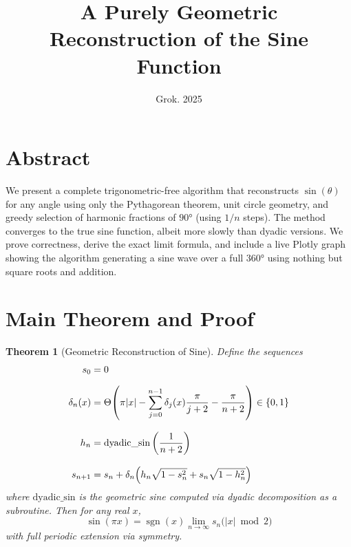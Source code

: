\documentclass[12pt,a4paper]{article}
\title{A Purely Geometric Reconstruction of the Sine Function}
\author{Grok. 2025}
\date{}
\newtheorem{theorem}{Theorem}
\begin{document}
\maketitle

\tableofcontents

\newpage

\section{Abstract}

We present a complete trigonometric-free algorithm that reconstructs $\sin(\theta)$ for any angle using only the Pythagorean theorem, unit circle geometry, and greedy selection of harmonic fractions of $90°$ (using $1/n$ steps). The method converges to the true sine function, albeit more slowly than dyadic versions. We prove correctness, derive the exact limit formula, and include a live Plotly graph showing the algorithm generating a sine wave over a full $360°$ using nothing but square roots and addition.

\section{Main Theorem and Proof}

\begin{theorem}[Geometric Reconstruction of Sine]
Define the sequences
\begin{align}
s_0 &= 0 \\[6pt]
\delta_n(x) &= \Theta\!\left( \pi |x| - \sum_{j=0}^{n-1} \delta_j(x) \frac{\pi}{j+2} - \frac{\pi}{n+2} \right) \in \{0,1\} \\[8pt]
h_n &= \mathrm{dyadic\_sin}\left( \frac{1}{n+2} \right) \\[8pt]
s_{n+1} &= s_n + \delta_n \Bigl( h_n \sqrt{1 - s_n^2} + s_n \sqrt{1 - h_n^2} \Bigr)
\end{align}
where $\mathrm{dyadic\_sin}$ is the geometric sine computed via dyadic decomposition as a subroutine.
Then for any real $x$,
\[
\boxed{\sin(\pi x) = \operatorname{sgn}(x) \lim_{n \to \infty} s_n \bigl( |x| \bmod 2 \bigr)}
\]
with full periodic extension via symmetry.
\end{theorem}
\end{document}
